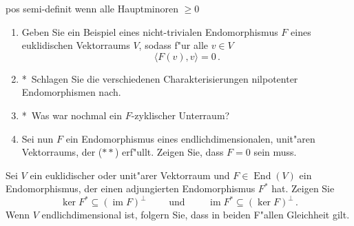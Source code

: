 \documentclass[a4,11pt]{article}
\DeclareMathOperator{\End}{End}
\DeclareMathOperator{\im}{im}
\newcommand{\bonusitem}{\item\hspace*{-2.4mm}*\ }
\begin{document}
\vspace*{-17mm}
{
\kopf
}



\begin{aufgabe}[4 Punkte]
pos semi-definit wenn alle Hauptminoren $\ge 0$
\end{aufgabe}

\begin{aufgabe}[4 Punkte]
  \begin{enumerate}
  \item Geben Sie ein Beispiel eines nicht-trivialen Endomorphismus
    $F$ eines euklidischen Vektorraums $V$, sodass f"ur alle $v \in V$
    \begin{equation}
      \tag{$**$}
      \langle F(v), v \rangle = 0 \,.
    \end{equation}
  \bonusitem Schlagen Sie die verschiedenen Charakterisierungen nilpotenter
  Endomorphismen nach.
  \bonusitem Was war nochmal ein $F$-zyklischer Unterraum?
  \item Sei nun $F$ ein Endomorphismus eines endlichdimensionalen,
    unit"aren Vektorraums, der ($**$) erf"ullt. Zeigen Sie, dass $F=0$ sein muss.
  \end{enumerate}
\end{aufgabe}

\begin{aufgabe}[4 Punkte]
  Sei $V$ ein euklidischer oder unit"arer Vektorraum und $F
  \in \End(V)$ ein Endomorphismus, der einen adjungierten
  Endomorphismus $F^*$ hat. Zeigen Sie
  $$
  \ker F^* \subseteq (\im F)^\perp \qquad \text{ und } \qquad \im F^*
  \subseteq (\ker F)^\perp \,.
  $$
  Wenn $V$ endlichdimensional ist, folgern Sie, dass in beiden F"allen
  Gleichheit gilt.
\end{aufgabe}

\end{document}
